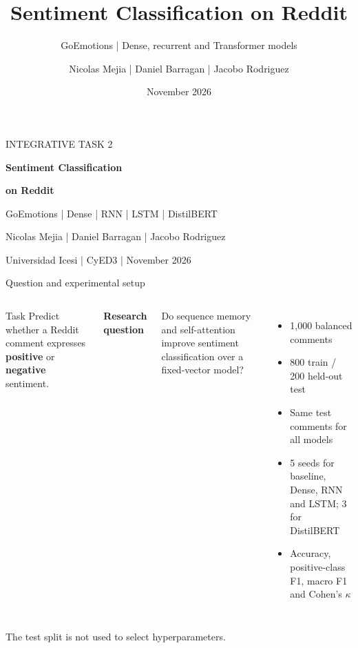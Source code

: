 \documentclass[aspectratio=169,10pt]{beamer}
\title{Sentiment Classification on Reddit}
\subtitle{GoEmotions | Dense, recurrent and Transformer models}
\author{Nicolas Mejia | Daniel Barragan | Jacobo Rodriguez}
\institute{Computability and Data Structures III | Universidad Icesi}
\date{November 2026}
\begin{document}
{
\begin{frame}[plain]
    \begin{minipage}[c][0.88\paperheight][c]{0.82\paperwidth}
      {\color{teal}\large INTEGRATIVE TASK 2}\par\vspace{0.45cm}
      {\color{white}\LARGE\bfseries Sentiment Classification\par}
      {\color{white}\LARGE\bfseries on Reddit\par}\vspace{0.35cm}
      {\color{white!80}\large GoEmotions | Dense | RNN | LSTM | DistilBERT}\par\vspace{1.1cm}
      {\color{white}\normalsize Nicolas Mejia | Daniel Barragan | Jacobo Rodriguez}\par
      {\color{white!70}\small Universidad Icesi | CyED3 | November 2026}
    \end{minipage}
\end{frame}}

\begin{frame}{Question and experimental setup}
\begin{columns}[T,onlytextwidth]
    \begin{block}{Task}
      Predict whether a Reddit comment expresses \textbf{positive} or \textbf{negative} sentiment.
    \end{block}
    \vspace{0.25cm}
    \large\textbf{Research question}\par
    \normalsize Do sequence memory and self-attention improve sentiment classification over a fixed-vector model?
    \begin{itemize}
      \item 1,000 balanced comments
      \item 800 train / 200 held-out test
      \item Same test comments for all models
      \item 5 seeds for baseline, Dense, RNN and LSTM; 3 for DistilBERT
      \item Accuracy, positive-class F1, macro F1 and Cohen's $\kappa$
    \end{itemize}
\end{columns}
\vfill
{\color{muted}\scriptsize The test split is not used to select hyperparameters.}
\end{frame}
\end{document}
